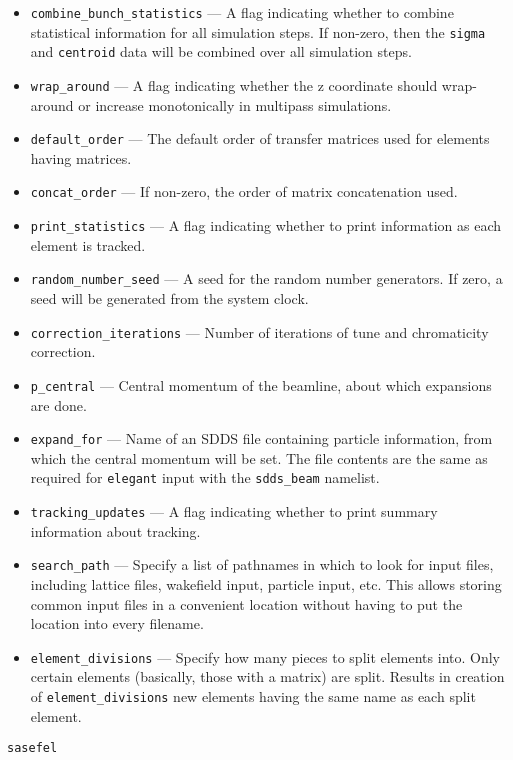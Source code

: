 \documentclass[11pt]{article}
\begin{document}
\begin{itemize}
\item \verb|combine_bunch_statistics| --- A flag indicating whether to
combine statistical information for all simulation steps.  If
non-zero, then the \verb|sigma| and \verb|centroid| data will be
combined over all simulation steps.
\item \verb|wrap_around| --- A flag indicating whether the z
coordinate should wrap-around or increase monotonically in multipass
simulations.
\item \verb|default_order| --- The default order of transfer matrices
used for elements having matrices.
\item \verb|concat_order| --- If non-zero, the order of matrix
concatenation used.
\item \verb|print_statistics| --- A flag indicating whether to print
information as each element is tracked.
\item \verb|random_number_seed| --- A seed for the random number generators.  If zero, a seed will be generated from the system clock.
\item \verb|correction_iterations| --- Number of iterations of tune and chromaticity correction.
\item \verb|p_central| --- Central momentum of the beamline, about which expansions are done.
\item \verb|expand_for| --- Name of an SDDS file containing particle information, from which the central
momentum will be set.  The file contents are the same as required for {\tt elegant} input with the \verb|sdds_beam| namelist.
\item \verb|tracking_updates| --- A flag indicating whether to print summary information about
tracking.
\item \verb|search_path| --- Specify a list of pathnames in which to look for input files,
 including lattice files, wakefield input, particle input, etc.  This allows storing common
 input files in a convenient location without having to put the location into every filename.
\item \verb|element_divisions| --- Specify how many pieces to split elements into.  Only 
 certain elements (basically, those with a matrix) are split.  Results in creation of 
 \verb|element_divisions| new elements having the same name as each split element.
\end{itemize}

\begin{latexonly}
\newpage
\begin{center}{\Large\verb|sasefel|}\end{center}
\end{latexonly}
\end{document}
